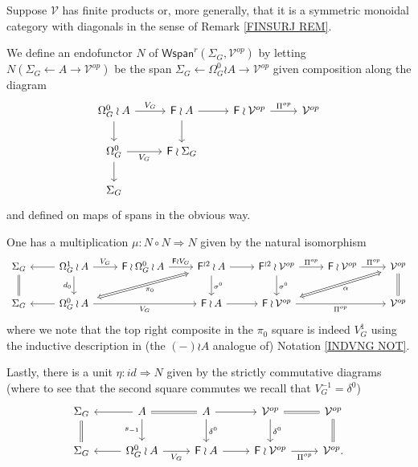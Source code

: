 \documentclass[a4paper,10pt]{article}%
\begin{document}
\begin{definition}
  \label{WSPAN_MONAD_DEFINITION}
	Suppose $\mathcal{V}$ has finite products or, more generally, that it is a symmetric monoidal category with diagonals in the sense of Remark \ref{FINSURJ REM}.
	
	We define an endofunctor $N$ of 
	$\mathsf{Wspan}^r(\Sigma_G,\mathcal{V}^{op})$
	by letting $N(\Sigma_G \leftarrow A \to \mathcal{V}^{op})$
	be the span $\Sigma_G \leftarrow \Omega_G^0 \wr A \to \mathcal{V}^{op}$ given composition along the diagram
\[
	\begin{tikzcd}
	\Omega_G^0 \wr A \ar{r}{V_G} \ar{d}&
	\Fin \wr A \ar{r} \ar{d}&
	\Fin \wr \mathcal{V}^{op} \ar{r}{\Pi^{op}} &
	\mathcal{V}^{op}
\\
	\Omega_{G}^{0} \ar{r}[swap]{V_G} \ar{d} &
	\Fin \wr \Sigma_G
\\
	\Sigma_G
	\end{tikzcd}
\]
and defined on maps of spans in the obvious way.

One has a multiplication $\mu \colon N \circ N \Rightarrow N$ given by the natural isomorphism
\begin{equation}\label{MULTDEFSPAN EQ}
	\begin{tikzcd}
	\Sigma_G \ar[equal]{d}&
	\Omega_{G}^1 \wr A \ar{r}{V_G} \ar{d}[swap]{d_{0}} \ar{l}&
	\Fin \wr \Omega_{G}^0 \wr A \ar{r}{\Fin \wr V_G} &
	|[alias=FFOmega]| \Fin^{\wr 2} \wr A \ar{d}{\sigma^0} \ar{r} &
	\Fin^{\wr 2} \wr \mathcal{V}^{op} \ar{d}{\sigma^0} \ar{r}{\Pi^{op}} &
	\Fin \wr \mathcal{V}^{op} \ar{r}{\Pi^{op}} &
	|[alias=dog]|
	\mathcal{V}^{op} \ar[equal]{d}
\\
	\Sigma_G &
	|[alias=Omega]|\Omega_{G}^{0} \wr A \ar{rr}[swap]{V_G} \ar{l}&&
	\Fin \wr A \ar{r} &
	|[alias=cat]|
	\Fin \wr \mathcal{V}^{op} \ar{rr}[swap]{\Pi^{op}} &&
	\mathcal{V}^{op}
	\arrow[Leftrightarrow, from=FFOmega, to=Omega,shorten <=0.15cm,,shorten >=0.15cm,"\pi_0"]
	\arrow[Leftrightarrow, from=dog, to=cat,shorten <=0.15cm,,shorten >=0.15cm,"\alpha"]
	\end{tikzcd}
\end{equation}
where we note that the top right composite in the 
$\pi_0$ square is indeed $V_{G}^{1}$
using the inductive description in (the $(\minus) \wr A$ analogue of) Notation \ref{INDVNG NOT}.

Lastly, there is a unit $\eta \colon id \Rightarrow N$ given by the strictly commutative diagrams
(where to see that the second square commutes we recall that $V_G^{-1} = \delta^0$)
\begin{equation}\label{UNITSPAN EQ}
	\begin{tikzcd}
	\Sigma_G \ar[equal]{d} &
	A \ar{l} \ar{d}[swap]{s_{-1}} \ar[equal]{r} &
	A \ar{d}{\delta^0} \ar{r} &
	\mathcal{V}^{op} \ar{d}{\delta^0} \ar[equal]{r}&
	\mathcal{V}^{op} \ar[equal]{d}
\\
	\Sigma_G &
	\Omega_{G}^{0} \wr A \ar{l} \ar{r}[swap]{V_G}&
	\Fin \wr A \ar{r} &
	\Fin \wr \mathcal{V}^{op} \ar{r}[swap]{\Pi^{op}} &
	\mathcal{V}^{op}.
	\end{tikzcd}
\end{equation}	
\end{definition}
\end{document}

